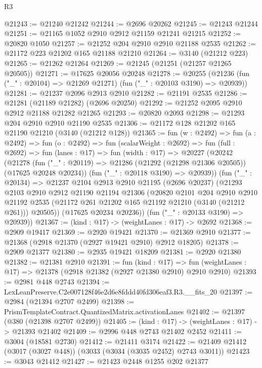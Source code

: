 \begin{lexlean}{R3}
\begin{coremodule}
@21243 := @21240 @21242
@21244 := @2696 @20262
@21245 := @21243 @21244
@21251 := @21165 @1052 @2910 @2912 @21159 @21241 @21215
@21252 := @20820 @1050
@21257 := @21252 @204 @2910 @2910 @21188 @2535
@21262 := @21172 @223 @21202 @165 @21188 @21210
@21264 := @3140 (@21212 @223)
@21265 := @21262 @21264
@21269 := @21245 (@21251 (@21257 @21265 @20505))
@21271 := @17625 @20056 @20248
@21278 := @20255 (@21236 (fun ("_" : @20104) => @21269 @21271) (fun ("_" : @20103 @3190) => @20939))
@21281 := @21237 @2096 @2913 @2910
@21282 := @21191 @2535
@21286 := @21281 (@21189 @21282) (@2696 @20250)
@21292 := @21252 @2095 @2910 @2912 @21188 @21282 @21265
@21293 := @20820 @2093
@21298 := @21293 @204 @2910 @2910 @21190 @2535
@21306 := @21172 @128 @21202 @165 @21190 @21210 (@3140 (@21212 @128))
@21365 := fun (w : @2492) =>
  fun (a : @2492) =>
  fun (o : @2492) =>
  fun (scalarWeight : @2692) =>
  fun (full : @2692) =>
  fun (lanes : @17) =>
  fun (width : @17) =>
  @20227
    (@20242
      (@21278
        (fun ("_" : @20119) => @21286 (@21292 (@21298 @21306 @20505)) (@17625 @20248 @20234))
        (fun ("_" : @20118 @3190) => @20939))
      (fun ("_" : @20134) =>
      @21237
        @2104
        @2913
        @2910
        @21195
        (@2696 @20237)
        (@21293
          @2103
          @2910
          @2912
          @21190
          @21194
          @21306
          (@20820
            @2101
            @204
            @2910
            @2910
            @21192
            @2535
            (@21172 @261 @21202 @165 @21192 @21210 (@3140 (@21212 @261)))
            @20505))
        (@17625 @20234 @20236))
      (fun ("_" : @20133 @3190) => @20939))
@21367 := (kind : @17) -> (weightLanes : @17) -> @2692
@21368 := @2909 @19417
@21369 := @2920 @19421
@21370 := @21369 @2910
@21377 := @21368 (@2918 @21370 (@2927 @19421 @2910) @2912 @18205)
@21378 := @2909 @21377
@21380 := @2935 @19421 @18209
@21381 := @2920 @21380
@21382 := @21381 @2910
@21391 := fun (kind : @17) =>
  fun (weightLanes : @17) => @21378 (@2918 @21382 (@2927 @21380 @2910) @2910 @2910)
@21393 := @2981 @448 @2743
@21394 := LexLeanPreserve.C2e007128f46e2d6e8fddd40fd306eaf3.R3.__fits_20
@21397 := @2984 (@21394 @2707 @2499)
@21398 := PrismTemplateContract.QuantizedMatrix.activationLanes
@21402 := @21397 (@380 (@21398 @2707 @2499))
@21405 := (kind : @17) -> (weightLanes : @17) -> @21393 @21402
@21409 := @2996 @448 @2743 @21402 @2452
@21411 := @3004 (@18581 @2730)
@21412 := @21411 @3174
@21422 := @21409 @21412 (@3017 (@3027 @448)) (@3033 (@3034 (@3035 @2452) @2743 @3011))
@21423 := @3043 @21412
@21427 := @21423 @2448 @1255 @202 @21377

\end{coremodule}
\end{lexlean}
